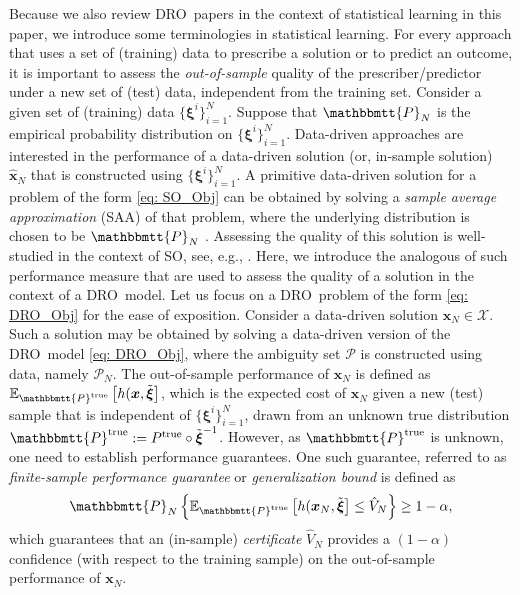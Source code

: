 \documentclass[final,onefignum,onetabnum]{class}
\newcommand{\ee}[2]{\mathbb{E}_{#1} \left[ #2 \right]}
\newcommand{\bs}[1]{\boldsymbol{#1}} %
\newcommand{\Ts}[1]{\mathbbmtt{#1}} %
\newcommand{\Cs}[1]{\mathcal{#1}} %
\newcommand{\txi}{\tilde{\bs{\xi}}}
\newcommand{\trueP}{\Ts{P}^{\text{true}}}
\newcommand{\dro}{DRO}
\begin{document}
Because we  also review \dro\ papers in the context of statistical learning in this paper, we introduce some terminologies in statistical learning. For every approach that uses a set of (training) data to prescribe a solution or to  predict an outcome, it is important to assess the {\it out-of-sample} quality of the prescriber/predictor under a new set of (test) data, independent from the training set. Consider a given set of (training) data $\{\bs{\xi}^{i}\}_{i=1}^{N}$. Suppose that $\Ts{P}_{N}$ is the empirical probability distribution on $\{\bs{\xi}^{i}\}_{i=1}^{N}$. Data-driven approaches are interested in the performance of a data-driven solution (or, in-sample solution) $\hat{\bs{x}}_{N}$  that is constructed using $\{\bs{\xi}^{i}\}_{i=1}^{N}$. %
A primitive data-driven solution for a problem of the form  \eqref{eq: SO_Obj} can be obtained by solving a {\it sample average approximation} (SAA)  of that problem, where the underlying distribution is chosen to be $\Ts{P}_{N}$ \cite{shapiro2014SP}.
Assessing the quality of this solution is well-studied in the context of SO, see, e.g., \citet{bayraksan2006quality,bayraksan2009quality,homem2014montecarlo}. Here, we introduce the analogous of such performance measure that are used to  assess the quality of a solution in the context of a \dro\ model. 
Let us focus on a \dro\ problem of the form  \eqref{eq: DRO_Obj} for the ease of exposition. Consider a data-driven solution $\bs{x}_{N} \in \Cs{X}$. Such a solution may be   obtained by solving a data-driven version of the \dro\ model \eqref{eq: DRO_Obj}, where the ambiguity set $\Cs{P}$ is constructed using data, namely $\Cs{P}_{N}$. 
The out-of-sample performance of $\bs{x}_{N}$ is defined as $\ee{\trueP}{h(\bs{x},\txi}$, which is the expected cost of $\bs{x}_{N}$ given  a new (test) sample that is independent of $\{\bs{\xi}^{i}\}_{i=1}^{N}$, drawn from an unknown true distribution $\trueP:=P^{\text{true}} \circ \txi^{-1}$. However, as $\trueP$ is unknown, one need to establish performance guarantees.  
One  such guarantee, referred to as {\it finite-sample performance guarantee} or {\it generalization bound} is defined as 
$$ \Ts{P}_{N} \left \lbrace \ee{\trueP}{h(\bs{x}_{N},\txi} \le \hat{V}_{N}   \right \rbrace \ge 1-\alpha,$$
which guarantees that an (in-sample) {\it certificate} $\hat{V}_{N}$ provides a $(1-\alpha)$ confidence (with respect to the training sample) on the  out-of-sample performance of $\bs{x}_{N}$. %
\end{document}
